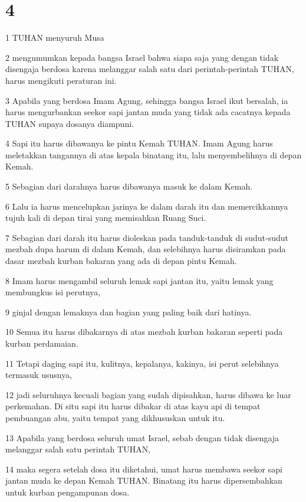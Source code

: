 \chapter{4}

\par 1 TUHAN menyuruh Musa
\par 2 mengumumkan kepada bangsa Israel bahwa siapa saja yang dengan tidak disengaja berdosa karena melanggar salah satu dari perintah-perintah TUHAN, harus mengikuti peraturan ini.
\par 3 Apabila yang berdosa Imam Agung, sehingga bangsa Israel ikut bersalah, ia harus mengurbankan seekor sapi jantan muda yang tidak ada cacatnya kepada TUHAN supaya dosanya diampuni.
\par 4 Sapi itu harus dibawanya ke pintu Kemah TUHAN. Imam Agung harus meletakkan tangannya di atas kepala binatang itu, lalu menyembelihnya di depan Kemah.
\par 5 Sebagian dari darahnya harus dibawanya masuk ke dalam Kemah.
\par 6 Lalu ia harus mencelupkan jarinya ke dalam darah itu dan memercikkannya tujuh kali di depan tirai yang memisahkan Ruang Suci.
\par 7 Sebagian dari darah itu harus dioleskan pada tanduk-tanduk di sudut-sudut mezbah dupa harum di dalam Kemah, dan selebihnya harus disiramkan pada dasar mezbah kurban bakaran yang ada di depan pintu Kemah.
\par 8 Imam harus mengambil seluruh lemak sapi jantan itu, yaitu lemak yang membungkus isi perutnya,
\par 9 ginjal dengan lemaknya dan bagian yang paling baik dari hatinya.
\par 10 Semua itu harus dibakarnya di atas mezbah kurban bakaran seperti pada kurban perdamaian.
\par 11 Tetapi daging sapi itu, kulitnya, kepalanya, kakinya, isi perut selebihnya termasuk ususnya,
\par 12 jadi seluruhnya kecuali bagian yang sudah dipisahkan, harus dibawa ke luar perkemahan. Di situ sapi itu harus dibakar di atas kayu api di tempat pembuangan abu, yaitu tempat yang dikhususkan untuk itu.
\par 13 Apabila yang berdosa seluruh umat Israel, sebab dengan tidak disengaja melanggar salah satu perintah TUHAN,
\par 14 maka segera setelah dosa itu diketahui, umat harus membawa seekor sapi jantan muda ke depan Kemah TUHAN. Binatang itu harus dipersembahkan untuk kurban pengampunan dosa.
